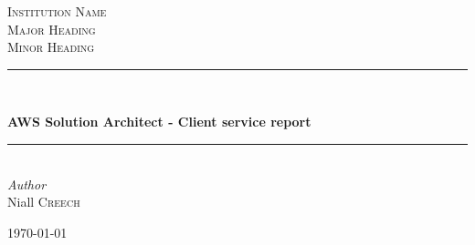 

	
	
	\begin{titlepage} %
		\newcommand{\HRule}{\rule{\linewidth}{0.5mm}} %
		
		\center %
		
		
		\textsc{\LARGE Institution Name}\\[1.5cm] %
		
		\textsc{\Large Major Heading}\\[0.5cm] %
		
		\textsc{\large Minor Heading}\\[0.5cm] %
		
		
		\HRule\\[0.4cm]
		

		\author{Niall Creech}
		{\huge\bfseries AWS Solution Architect - Client service report }\\[0.4cm] %
		
		\HRule\\[1.5cm]
		

		{\large\textit{Author}}\\
		Niall \textsc{Creech} %
		
		
		\vfill\vfill\vfill %
		
		{\large\today} %
		
		
		
		
		\vfill %
		
	\end{titlepage}
	
